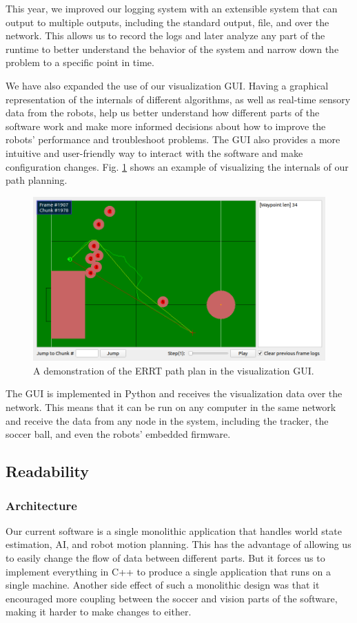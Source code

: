 \documentclass[runningheads]{llncs}
\begin{document}
This year, we improved our logging system with an extensible system that can output to multiple outputs, including the standard output, file, and over the network. This allows us to record the logs and later analyze any part of the runtime to better understand the behavior of the system and narrow down the problem to a specific point in time.

We have also expanded the use of our visualization GUI. Having a graphical representation of the internals of different algorithms, as well as real-time sensory data from the robots, help us better understand how different parts of the software work and make more informed decisions about how to improve the robots' performance and troubleshoot problems. The GUI also provides a more intuitive and user-friendly way to interact with the software and make configuration changes. Fig. \ref{fig_visualizer} shows an example of visualizing the internals of our path planning.

\begin{figure}
    \includegraphics[width=\textwidth]{images/visual1.png}
    \caption{A demonstration of the ERRT path plan in the visualization GUI.}
    \label{fig_visualizer}
\end{figure}

The GUI is implemented in Python and receives the visualization data over the network. This means that it can be run on any computer in the same network and receive the data from any node in the system, including the tracker, the soccer ball, and even the robots' embedded firmware.


\subsection{Readability}

\subsubsection{Architecture}
Our current software is a single monolithic application that handles world state estimation, AI, and robot motion planning. This has the advantage of allowing us to easily change the flow of data between different parts. But it forces us to implement everything in C++ to produce a single application that runs on a single machine. Another side effect of such a monolithic design was that it encouraged more coupling between the soccer and vision parts of the software, making it harder to make changes to either.
\end{document}
